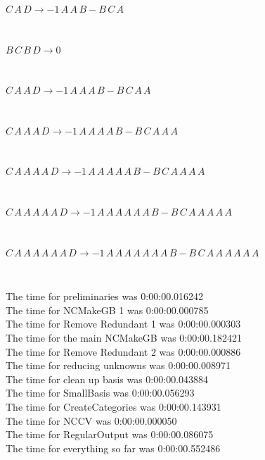 \documentclass[rep10,leqno]{report}
\begin{document}
\begin{minipage}{6in}
$
C\,
 A\,
 D\rightarrow -1\,
 A\,
 A\,
 B - B\,
 C\,
 A
$
\end{minipage}\medskip \\
\begin{minipage}{6in}
$
B\,
 C\,
 B\,
 D\rightarrow 0
$
\end{minipage}\medskip \\
\begin{minipage}{6in}
$
C\,
 A\,
 A\,
 D\rightarrow -1\,
 A\,
 A\,
 A\,
 B - B\,
 C\,
 A\,
 A
$
\end{minipage}\medskip \\
\begin{minipage}{6in}
$
C\,
 A\,
 A\,
 A\,
 D\rightarrow -1\,
 A\,
 A\,
 A\,
 A\,
 B - B\,
 C\,
 A\,
 A\,
 A
$
\end{minipage}\medskip \\
\begin{minipage}{6in}
$
C\,
 A\,
 A\,
 A\,
 A\,
 D\rightarrow -1\,
 A\,
 A\,
 A\,
 A\,
 A\,
 B - B\,
 C\,
 A\,
 A\,
 A\,
 A
$
\end{minipage}\medskip \\
\begin{minipage}{6in}
$
C\,
 A\,
 A\,
 A\,
 A\,
 A\,
 D\rightarrow -1\,
 A\,
 A\,
 A\,
 A\,
 A\,
 A\,
 B - B\,
 C\,
 A\,
 A\,
 A\,
 A\,
 A
$
\end{minipage}\medskip \\
\begin{minipage}{6in}
$
C\,
 A\,
 A\,
 A\,
 A\,
 A\,
 A\,
 D\rightarrow -1\,
 A\,
 A\,
 A\,
 A\,
 A\,
 A\,
 A\,
 B - B\,
 C\,
 A\,
 A\,
 A\,
 A\,
 A\,
 A
$
\end{minipage}\\
\vspace{10pt}

\noindent
The time for preliminaries was 0:00:00.016242\\
The time for NCMakeGB 1 was 0:00:00.000785\\
The time for Remove Redundant 1 was 0:00:00.000303\\
The time for the main NCMakeGB was 0:00:00.182421\\
The time for Remove Redundant 2 was 0:00:00.000886\\
The time for reducing unknowns was 0:00:00.008971\\
The time for clean up basis was 0:00:00.043884\\
The time for SmallBasis was 0:00:00.056293\\
The time for CreateCategories was 0:00:00.143931\\
The time for NCCV was 0:00:00.000050\\
The time for RegularOutput was 0:00:00.086075\\
The time for everything so far was 0:00:00.552486\\
\end{document}
